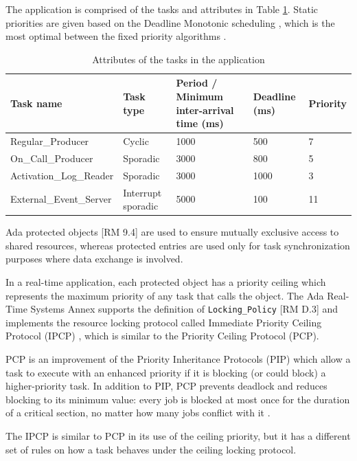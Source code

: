 \documentclass{article}
\begin{document}
The application is comprised of the tasks and attributes in Table \ref{tab:tasks-attributes}. Static priorities are given based on the Deadline Monotonic scheduling \cite{rm-dm}, which is the most optimal between the fixed priority algorithms \cite{optimality-rm-dm}.

\begin{table}[!htbp]
   \centering
   \begin{tabular}{lllll}
     \toprule
     Task name & Task type & Period / Minimum inter-arrival time (ms) & Deadline (ms) & Priority  \\
     \midrule
     Regular\_Producer & Cyclic & 1000 & 500 & 7 \\
     On\_Call\_Producer & Sporadic & 3000 & 800 & 5 \\
     Activation\_Log\_Reader & Sporadic & 3000 & 1000 & 3 \\
     External\_Event\_Server & Interrupt sporadic & 5000 & 100 & 11 \\
     \bottomrule
   \end{tabular}
   \caption{Attributes of the tasks in the application \cite{ycs}}
   \label{tab:tasks-attributes}
\end{table}

Ada protected objects [RM 9.4] are used to ensure mutually exclusive access to shared resources, whereas protected entries are used only for task synchronization purposes where data exchange is involved.

In a real-time application, each protected object has a priority ceiling which represents the maximum priority of any task that calls the object. The Ada Real-Time Systems Annex supports the definition of  \texttt{Locking\_Policy} [RM D.3] and implements the resource locking protocol called Immediate Priority Ceiling Protocol (IPCP) \cite{ada-pcp}, which is similar to the Priority Ceiling Protocol (PCP).

PCP is an improvement of the Priority Inheritance Protocols (PIP) which allow a task to execute with an enhanced priority if it is blocking (or could block) a higher-priority task. In addition to PIP, PCP prevents deadlock and reduces blocking to its minimum value: every job is blocked at most once for the duration of a critical section, no matter how many jobs conflict with it \cite{pcp-blocking}.

The IPCP is similar to PCP in its use of the ceiling priority, but it has a different set of rules on how a task behaves under the ceiling locking protocol.
\end{document}
